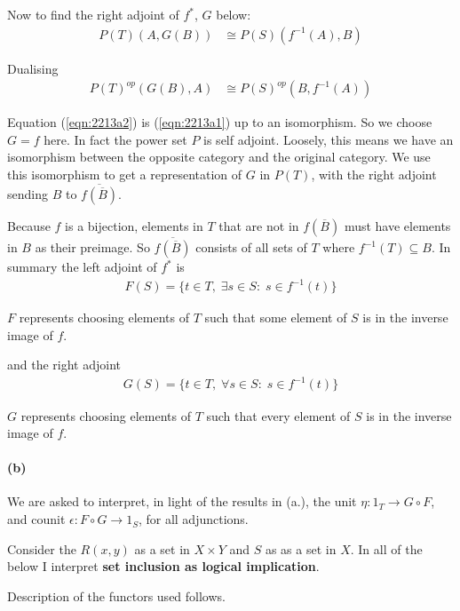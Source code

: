 \documentclass{article}
\begin{document}
Now to find the right adjoint of $f^*$, $G$ below:
\begin{align*}
  P(T)(A,G(B)) & \cong P(S)(f^{-1}(A), B)
\end{align*}

Dualising
\begin{align}
\label{eqn:2213a2}
  P(T)^{op}(G(B),A) & \cong P(S)^{op}(B, f^{-1}(A))
\end{align}

Equation (\ref{eqn:2213a2}) is (\ref{eqn:2213a1}) up to an isomorphism. So we choose $G = f$ here. In fact the power set $P$ is self adjoint. Loosely, this means we have an isomorphism between the opposite category and the original category. We use this isomorphism to get a representation of $G$ in $P(T)$, with the right adjoint sending $B$ to $\overline{f(\overline{B})}$.

Because $f$ is a bijection, elements in $T$ that are not in $f(\overline{B})$ must have elements in $B$ as their preimage. So $\overline{f(\overline{B})}$ consists of all sets of $T$ where $f^{-1}(T) \subseteq B$. In summary the left adjoint of $f^*$ is
\begin{align*}
  F(S) = \{ t \in T, \; \exists s \in S :\; s \in f^{-1}(t) \}
\end{align*}

$F$ represents choosing elements of $T$ such that some element of $S$ is in the inverse image of $f$.

and the right adjoint
\begin{align*}
  G(S) = \{ t \in T, \; \forall s \in S :\; s \in f^{-1}(t) \}
\end{align*}

$G$ represents choosing elements of $T$ such that every element of $S$ is in the inverse image of $f$.

\paragraph{(b)}

We are asked to interpret, in light of the results in (a.), the unit $\eta\colon 1_T \rightarrow G \circ F$, and counit $\epsilon\colon F \circ G \rightarrow 1_S$, for all adjunctions.

Consider the $R(x, y)$ as a set in $X \times Y$ and $S$ as as a set in $X$. In all of the below I interpret \textbf{set inclusion as logical implication}.

Description of the functors used follows.
\end{document}
